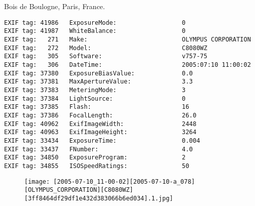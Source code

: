 \section{\protect{}}
\noindent Bois de Boulogne, Paris, France.
\noindent
\begin{lstlisting}
EXIF tag: 41986   ExposureMode:                  0
EXIF tag: 41987   WhiteBalance:                  0
EXIF tag:   271   Make:                          OLYMPUS CORPORATION
EXIF tag:   272   Model:                         C8080WZ
EXIF tag:   305   Software:                      v757-75
EXIF tag:   306   DateTime:                      2005:07:10 11:00:02
EXIF tag: 37380   ExposureBiasValue:             0.0
EXIF tag: 37381   MaxApertureValue:              3.3
EXIF tag: 37383   MeteringMode:                  3
EXIF tag: 37384   LightSource:                   0
EXIF tag: 37385   Flash:                         16
EXIF tag: 37386   FocalLength:                   26.0
EXIF tag: 40962   ExifImageWidth:                2448
EXIF tag: 40963   ExifImageHeight:               3264
EXIF tag: 33434   ExposureTime:                  0.004
EXIF tag: 33437   FNumber:                       4.0
EXIF tag: 34850   ExposureProgram:               2
EXIF tag: 34855   ISOSpeedRatings:               50

\end{lstlisting}
\clearpage
\begin{figure}
\raggedleft
\texttt{[image: [2005-07-10\_11-00-02][2005-07-10-a\_078][OLYMPUS\_CORPORATION][C8080WZ][3ff8464df29df1e432d383066b6ed034].1.jpg]}
\end{figure}


\clearpage
